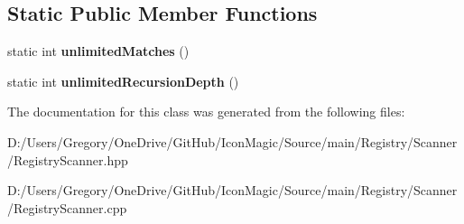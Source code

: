 \subsection*{Static Public Member Functions}
\begin{DoxyCompactItemize}
\item 
\hypertarget{class_registry_scanner_a53c683cba9076bbe56eebc18b140c0c3}{}static int {\bfseries unlimited\+Matches} ()\label{class_registry_scanner_a53c683cba9076bbe56eebc18b140c0c3}

\item 
\hypertarget{class_registry_scanner_a97303e1189cc7a6982aa7484d929f966}{}static int {\bfseries unlimited\+Recursion\+Depth} ()\label{class_registry_scanner_a97303e1189cc7a6982aa7484d929f966}

\end{DoxyCompactItemize}


The documentation for this class was generated from the following files\+:\begin{DoxyCompactItemize}
\item 
D\+:/\+Users/\+Gregory/\+One\+Drive/\+Git\+Hub/\+Icon\+Magic/\+Source/main/\+Registry/\+Scanner/Registry\+Scanner.\+hpp\item 
D\+:/\+Users/\+Gregory/\+One\+Drive/\+Git\+Hub/\+Icon\+Magic/\+Source/main/\+Registry/\+Scanner/Registry\+Scanner.\+cpp\end{DoxyCompactItemize}
